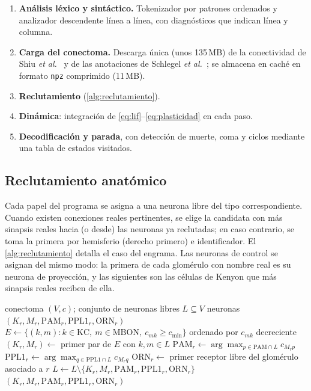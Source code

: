 \documentclass[11pt,a4paper]{article}
\theoremstyle{plain}
\theoremstyle{definition}
\theoremstyle{remark}
\newcommand{\PAM}{\mathrm{PAM}}
\newcommand{\PPL}{\mathrm{PPL1}}
\newcommand{\KC}{\mathrm{KC}}
\newcommand{\MBON}{\mathrm{MBON}}
\newcommand{\ORN}{\mathrm{ORN}}
\begin{document}
\begin{enumerate}[leftmargin=*,itemsep=2pt]
  \item \textbf{Análisis léxico y sintáctico.} Tokenizador por patrones
        ordenados y analizador descendente línea a línea, con diagnósticos
        que indican línea y columna.
  \item \textbf{Carga del conectoma.} Descarga única (unos 135\,MB) de la
        conectividad de Shiu \emph{et al.}~\cite{shiu2024} y de las
        anotaciones de Schlegel \emph{et al.}~\cite{schlegel2024}; se
        almacena en caché en formato \texttt{npz} comprimido (11\,MB).
  \item \textbf{Reclutamiento} (\cref{alg:reclutamiento}).
  \item \textbf{Dinámica}: integración de
        \eqref{eq:lif}--\eqref{eq:plasticidad} en cada paso.
  \item \textbf{Decodificación y parada}, con detección de muerte, coma y
        ciclos mediante una tabla de estados visitados.
\end{enumerate}

\subsection{Reclutamiento anatómico}

Cada papel del programa se asigna a una neurona libre del tipo
correspondiente. Cuando existen conexiones reales pertinentes, se elige la
candidata con más sinapsis reales hacia (o desde) las neuronas ya
reclutadas; en caso contrario, se toma la primera por hemisferio (derecho
primero) e identificador. El \cref{alg:reclutamiento} detalla el caso del
engrama. Las neuronas de control se asignan del mismo modo: la primera de
cada glomérulo con nombre real es su neurona de proyección, y las siguientes
son las células de Kenyon que más sinapsis reales reciben de ella.

\begin{algorithm}[t]
\caption{Reclutamiento anatómico de un engrama $r$.}
\label{alg:reclutamiento}
\begin{algorithmic}[1]
\Require conectoma $(V,c)$; conjunto de neuronas libres $L\subseteq V$
\Ensure neuronas $(K_r,M_r,\PAM_r,\PPL_r,\ORN_r)$
\State $E\gets\{(k,m): k\in\KC,\ m\in\MBON,\ c_{mk}\ge c_{\min}\}$ ordenado por $c_{mk}$ decreciente
\State $(K_r,M_r)\gets$ primer par de $E$ con $k,m\in L$
\State $\PAM_r\gets\arg\max_{p\in\PAM\cap L} c_{M_r p}$ 
\State $\PPL_r\gets\arg\max_{q\in\PPL\cap L} c_{M_r q}$
\State $\ORN_r\gets$ primer receptor libre del glomérulo asociado a $r$
\State $L\gets L\setminus\{K_r,M_r,\PAM_r,\PPL_r,\ORN_r\}$
\State \Return $(K_r,M_r,\PAM_r,\PPL_r,\ORN_r)$
\end{algorithmic}
\end{algorithm}
\end{document}
